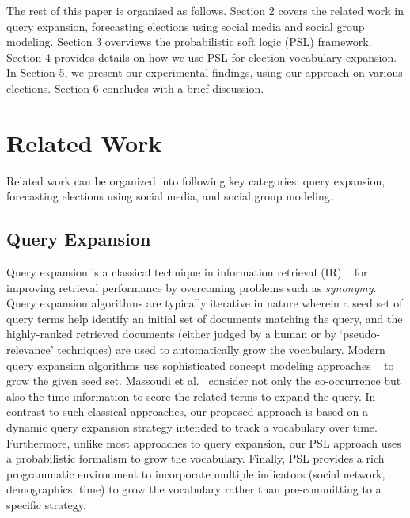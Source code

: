 The rest of this paper is organized as follows. Section 2 covers the related work in query expansion, forecasting elections using social media and social group modeling. Section 3 overviews the probabilistic soft logic (PSL) framework. Section 4 provides details on how we use PSL for election vocabulary expansion. In Section 5, we present our experimental findings, using our approach on various elections. Section 6 concludes with a brief discussion.

\section{Related Work}
Related work can be organized into following key categories: query expansion, forecasting elections using social media,
and social group modeling.
\begin{comment}
\reviews{refer\\
Dongsheng Duan, Yuhua Li, Ruixuan Li, Rui Zhang, and Aiming Wen. 2012. RankTopic: Ranking Based Topic Modeling. In Proceedings of the 2012 IEEE 12th International Conference on Data Mining (ICDM 12) [This work also captures relational information] ; Daniel Ramage, Susan T. Dumais, and Daniel J. Liebling. ICWSM, The AAAI Press, (2010); Castella, Quim and Sutton, Charles A Word Storms: Multiples of Word Clouds for Visual Comparison of Documents. CoRR abs/1301.0503 (2013)\\
Lau, Jey Han, Nigel Collier and Timothy Baldwin (2012) On-line Trend Analysis with Topic Models: hashtag twitter trends detection topic model online, In Proceedings of the 24th International Conference on Computational Linguistics (COLING 2012)
}
\end{comment}

\subsection{Query Expansion}
Query expansion is a classical technique in information retrieval (IR) ~\cite{manning2008introduction} for improving
retrieval performance by overcoming problems such as {\it synonymy}. Query expansion algorithms
are typically iterative in nature wherein a seed set of query terms help identify an initial set
of documents matching the query, and the highly-ranked retrieved documents (either judged by a human
or by `pseudo-relevance' techniques) are used to automatically grow the vocabulary. Modern
query expansion algorithms use sophisticated concept modeling approaches ~\cite{metzler2007latent}
to grow the given seed set. Massoudi et al.~\cite{massoudi2011incorporating} consider not only the co-occurrence but also the time information to score the related terms to expand the query.  
In contrast to such classical approaches,
our proposed approach is based on a dynamic query expansion strategy  intended to track a vocabulary
over time. Furthermore, unlike most approaches to query expansion, our PSL approach uses a probabilistic formalism
to grow the vocabulary. Finally, PSL provides a rich programmatic environment to incorporate 
multiple indicators (social network, demographics, time) to grow the vocabulary rather than pre-committing to a 
specific strategy.

